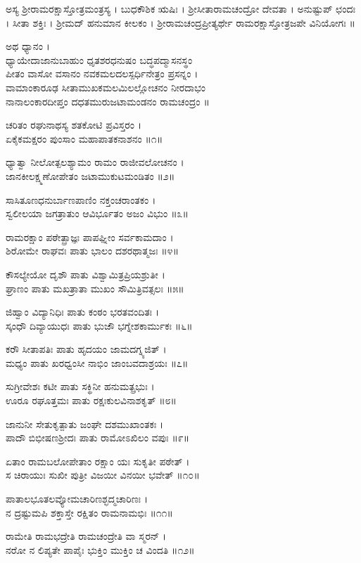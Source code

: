 ಅಸ್ಯ ಶ್ರೀರಾಮರಕ್ಷಾಸ್ತೋತ್ರಮಂತ್ರಸ್ಯ । ಬುಧಕೌಶಿಕ ಋಷಿಃ । ಶ್ರೀಸೀತಾರಾಮಚಂದ್ರೋ ದೇವತಾ । ಅನುಷ್ಟುಪ್ ಛಂದಃ । ಸೀತಾ ಶಕ್ತಿಃ । ಶ್ರೀಮದ್ ಹನುಮಾನ ಕೀಲಕಂ । ಶ್ರೀರಾಮಚಂದ್ರಪ್ರೀತ್ಯರ್ಥೇ ರಾಮರಕ್ಷಾಸ್ತೋತ್ರಜಪೇ ವಿನಿಯೋಗಃ ॥

ಅಥ ಧ್ಯಾನಂ ।\\
ಧ್ಯಾಯೇದಾಜಾನುಬಾಹುಂ ಧೃತಶರಧನುಷಂ ಬದ್ಧಪದ್ಮಾಸನಸ್ಥಂ\\
ಪೀತಂ ವಾಸೋ ವಸಾನಂ ನವಕಮಲದಲಸ್ಪರ್ಧಿನೇತ್ರಂ ಪ್ರಸನ್ನಂ ।\\
ವಾಮಾಂಕಾರೂಢ ಸೀತಾಮುಖಕಮಲಮಿಲಲ್ಲೋಚನಂ ನೀರದಾಭಂ\\
ನಾನಾಲಂಕಾರದೀಪ್ತಂ ದಧತಮುರುಜಟಾಮಂಡನಂ ರಾಮಚಂದ್ರಂ ॥

ಚರಿತಂ ರಘುನಾಥಸ್ಯ ಶತಕೋಟಿ ಪ್ರವಿಸ್ತರಂ ।\\
ಏಕೈಕಮಕ್ಷರಂ ಪುಂಸಾಂ ಮಹಾಪಾತಕನಾಶನಂ ॥೧॥

ಧ್ಯಾತ್ವಾ ನೀಲೋತ್ಪಲಶ್ಯಾಮಂ ರಾಮಂ ರಾಜೀವಲೋಚನಂ ।\\
ಜಾನಕೀಲಕ್ಷ್ಮಣೋಪೇತಂ ಜಟಾಮುಕುಟಮಂಡಿತಂ ॥೨॥

ಸಾಸಿತೂಣಧನುರ್ಬಾಣಪಾಣಿಂ ನಕ್ತಂಚರಾಂತಕಂ ।\\
ಸ್ವಲೀಲಯಾ ಜಗತ್ರಾತುಂ ಆವಿರ್ಭೂತಂ ಅಜಂ ವಿಭುಂ ॥೩॥

ರಾಮರಕ್ಷಾಂ ಪಠೇತ್ಪ್ರಾಜ್ಞಃ ಪಾಪಘ್ನೀಂ ಸರ್ವಕಾಮದಾಂ ।\\
ಶಿರೋಮೇ ರಾಘವಃ ಪಾತು ಭಾಲಂ ದಶರಥಾತ್ಮಜಃ ॥೪॥

ಕೌಸಲ್ಯೇಯೋ ದೃಶೌ ಪಾತು ವಿಶ್ವಾಮಿತ್ರಪ್ರಿಯಶ್ರುತೀ ।\\
ಘ್ರಾಣಂ ಪಾತು ಮಖತ್ರಾತಾ ಮುಖಂ ಸೌಮಿತ್ರಿವತ್ಸಲಃ ॥೫॥

ಜಿಹ್ವಾಂ ವಿದ್ಯಾನಿಧಿಃ ಪಾತು ಕಂಠಂ ಭರತವಂದಿತಃ ।\\
ಸ್ಕಂಧೌ ದಿವ್ಯಾಯುಧಃ ಪಾತು ಭುಜೌ ಭಗ್ನೇಶಕಾರ್ಮುಕಃ ॥೬॥

ಕರೌ ಸೀತಾಪತಿಃ ಪಾತು ಹೃದಯಂ ಜಾಮದಗ್ನ್ಯಜಿತ್ ।\\
ಮಧ್ಯಂ ಪಾತು ಖರಧ್ವಂಸೀ ನಾಭಿಂ ಜಾಂಬವದಾಶ್ರಯಃ ॥೭॥

ಸುಗ್ರೀವೇಶಃ ಕಟೀ ಪಾತು ಸಕ್ಥಿನೀ ಹನುಮತ್ಪ್ರಭುಃ ।\\
ಊರೂ ರಘೂತ್ತಮಃ ಪಾತು ರಕ್ಷಃಕುಲವಿನಾಶಕೃತ್ ॥೮॥

ಜಾನುನೀ ಸೇತುಕೃತ್ಪಾತು ಜಂಘೇ ದಶಮುಖಾಂತಕಃ ।\\
ಪಾದೌ ಬಿಭೀಷಣಶ್ರೀದಃ ಪಾತು ರಾಮೋಽಖಿಲಂ ವಪುಃ ॥೯॥

ಏತಾಂ ರಾಮಬಲೋಪೇತಾಂ ರಕ್ಷಾಂ ಯಃ ಸುಕೃತೀ ಪಠೇತ್ ।\\
ಸ ಚಿರಾಯುಃ ಸುಖೀ ಪುತ್ರೀ ವಿಜಯೀ ವಿನಯೀ ಭವೇತ್ ॥೧೦॥

ಪಾತಾಲಭೂತಲವ್ಯೋಮಚಾರಿಣಶ್ಛದ್ಮಚಾರಿಣಃ ।\\
ನ ದ್ರಷ್ಟುಮಪಿ ಶಕ್ತಾಸ್ತೇ ರಕ್ಷಿತಂ ರಾಮನಾಮಭಿಃ ॥೧೧॥

ರಾಮೇತಿ ರಾಮಭದ್ರೇತಿ ರಾಮಚಂದ್ರೇತಿ ವಾ ಸ್ಮರನ್ ।\\
ನರೋ ನ ಲಿಪ್ಯತೇ ಪಾಪೈಃ ಭುಕ್ತಿಂ ಮುಕ್ತಿಂ ಚ ವಿಂದತಿ ॥೧೨॥

